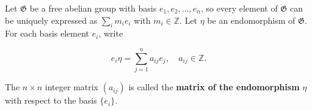 Let $\mathfrak{G}$ be a free abelian group with basis $e_1, e_2, \ldots, e_n$, so every element of $\mathfrak{G}$ can be uniquely expressed as $\sum_{i} m_i e_i$ with $m_i \in \mathbb{Z}$. Let $\eta$ be an endomorphism of $\mathfrak{G}$. For each basis element $e_i$, write

$$e_i \eta = \sum_{j=1}^{n} a_{ij} e_j, \quad a_{ij} \in \mathbb{Z}.$$

The $n \times n$ integer matrix $(a_{ij})$ is called the \textbf{matrix of the endomorphism} $\eta$ with respect to the basis $\{e_i\}$.
